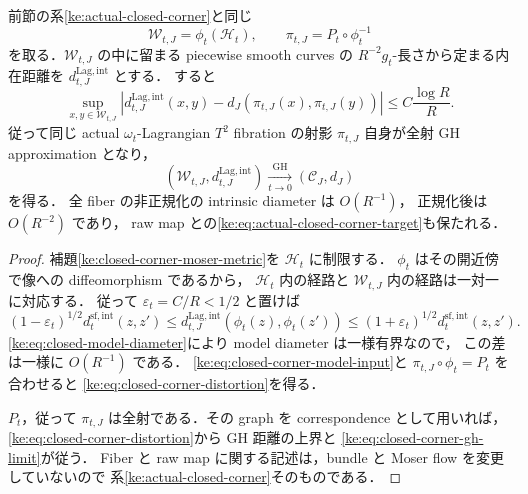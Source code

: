 \begin{theorem}
\label{ke:closed-corner-gh}
前節の系\ref{ke:actual-closed-corner}と同じ
\[
 \mathcal W_{t,J}=\phi_t(\mathcal H_t),\qquad
 \pi_{t,J}=P_t\circ\phi_t^{-1}
\]
を取る．$\mathcal W_{t,J}$ の中に留まる piecewise smooth curves の
$R^{-2}g_t$-長さから定まる内在距離を $d_{t,J}^{\mathrm{Lag,int}}$ とする．
すると
\begin{equation}\label{ke:eq:closed-corner-distortion}
 \sup_{x,y\in\mathcal W_{t,J}}
 \left|d_{t,J}^{\mathrm{Lag,int}}(x,y)
      -d_J(\pi_{t,J}(x),\pi_{t,J}(y))\right|
 \le C\frac{\log R}{R}.
\end{equation}
従って同じ actual $\omega_t$-Lagrangian $T^2$ fibration の射影
$\pi_{t,J}$ 自身が全射 GH approximation となり，
\begin{equation}\label{ke:eq:closed-corner-gh-limit}
 (\mathcal W_{t,J},d_{t,J}^{\mathrm{Lag,int}})
 \xrightarrow[t\to0]{\mathrm{GH}}(\mathcal C_J,d_J)
\end{equation}
を得る．
全 fiber の非正規化の intrinsic diameter は $O(R^{-1})$，
正規化後は $O(R^{-2})$ であり，
raw map との\eqref{ke:eq:actual-closed-corner-target}も保たれる．
\end{theorem}
\begin{proof}
補題\ref{ke:closed-corner-moser-metric}を $\mathcal H_t$ に制限する．
$\phi_t$ はその開近傍で像への diffeomorphism であるから，
$\mathcal H_t$ 内の経路と $\mathcal W_{t,J}$ 内の経路は一対一に対応する．
従って $\varepsilon_t=C/R<1/2$ と置けば
\[
 (1-\varepsilon_t)^{1/2}d_t^{\mathrm{sf,int}}(z,z')
 \le d_{t,J}^{\mathrm{Lag,int}}(\phi_t(z),\phi_t(z'))
 \le(1+\varepsilon_t)^{1/2}d_t^{\mathrm{sf,int}}(z,z').
\]
\eqref{ke:eq:closed-model-diameter}により model diameter は一様有界なので，
この差は一様に $O(R^{-1})$ である．
\eqref{ke:eq:closed-corner-model-input}と
$\pi_{t,J}\circ\phi_t=P_t$ を合わせると
\eqref{ke:eq:closed-corner-distortion}を得る．

$P_t$，従って $\pi_{t,J}$ は全射である．その graph を correspondence として用いれば，
\eqref{ke:eq:closed-corner-distortion}から GH 距離の上界と
\eqref{ke:eq:closed-corner-gh-limit}が従う．
Fiber と raw map に関する記述は，bundle と Moser flow を変更していないので
系\ref{ke:actual-closed-corner}そのものである．
\end{proof}

